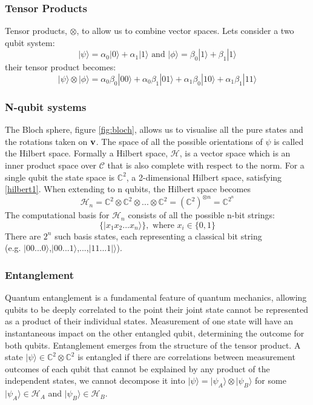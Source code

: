 \documentclass[12pt]{article}
\numberwithin{equation}{section}
\begin{document}
\subsubsection{Tensor Products}
Tensor products, $\otimes$, to allow us to combine vector spaces. Lets consider 
a two qubit system:
\begin{equation}
  |\psi\rangle = \alpha_0|0\rangle + \alpha_1|1\rangle \text{  and  }
  |\phi\rangle = \beta_0|1\rangle  + \beta_1|1\rangle
\end{equation}
their tensor product becomes:
\begin{equation}
  |\psi\rangle \otimes |\phi\rangle = 
  \alpha_0\beta_0|00\rangle + 
  \alpha_0\beta_1|01\rangle + 
  \alpha_1\beta_0|10\rangle + 
  \alpha_1\beta_1|11\rangle  
\end{equation}
\subsubsection{N-qubit systems}
The Bloch sphere, figure \ref{fig:bloch}, allows us to visualise all the pure states and the rotations taken 
on $\bold{v}$. 
The space of all the possible orientations of $\psi$ is called the Hilbert space. 
Formally a Hilbert space, $\mathcal{H}$, is a vector space which is an inner product space 
over $\mathcal{C}$ that is also complete with respect to the norm. For a single 
qubit the state space is $\mathbb{C}^2$, a 2-dimensional Hilbert space, satisfying 
\ref{hilbert1}. When extending to n qubits, the Hilbert space becomes 
\begin{equation}
  \mathcal{H}_n = \mathbb{C}^2 \otimes \mathbb{C}^2 \otimes ... \otimes \mathbb{C}^2 
  =(\mathbb{C}^2)^{\otimes n} = \mathbb{C}^{2^n}
\end{equation}
The computational basis for $\mathcal{H}_n$ consists of all the possible n-bit strings:
\begin{equation}
  \{|x_1x_2...x_n\rangle\}, \text{ where } x_i \in \{0,1\}
\end{equation}
There are $2^n$ such basis states, each representing a classical bit string\\
(e.g. $|00...0\rangle$,$|00...1\rangle$,...,$|11...1|\rangle$). 

\subsubsection{Entanglement}
Quantum entanglement is a fundamental feature of quantum mechanics, allowing 
qubits to be deeply correlated to the point their joint state cannot be represented 
as a product of their individual states. Measurement of one state will have an 
instantaneous impact on the other entangled qubit, determining the outcome for both 
qubits. 
Entanglement emerges from the structure of the tensor product. A state 
$|\psi\rangle \in \mathbb{C}^2 \otimes \mathbb{C}^2$ is entangled if there are 
correlations between measurement outcomes of each qubit that cannot be explained
by any product of the independent states, we cannot decompose it into 
$|\psi\rangle = |\psi_A\rangle \otimes |\psi_B\rangle$ for some $|\psi_A\rangle \in \mathcal{H}_A$
and $|\psi_B\rangle \in \mathcal{H}_B$.
\end{document}

